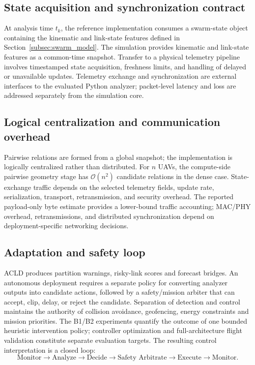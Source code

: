 \documentclass[preprint,12pt]{elsarticle}
\theoremstyle{definition}\newtheorem{definition}{Definition}
\theoremstyle{plain}\newtheorem{theorem}{Theorem}
\theoremstyle{plain}\newtheorem{lemma}{Lemma}
\theoremstyle{plain}\newtheorem{corollary}{Corollary}
\theoremstyle{plain}\newtheorem{assumption}{Assumption}
\theoremstyle{remark}\newtheorem{remark}[theorem]{Remark}
\begin{document}
\subsection{State acquisition and synchronization contract}
\label{subsec:state_contract}
At analysis time $t_k$, the reference implementation consumes a swarm-state object containing the kinematic and link-state features defined in Section~\ref{subsec:swarm_model}. The simulation provides kinematic and link-state features as a common-time snapshot. Transfer to a physical telemetry pipeline involves timestamped state acquisition, freshness limits, and handling of delayed or unavailable updates. Telemetry exchange and synchronization are external interfaces to the evaluated Python analyzer; packet-level latency and loss are addressed separately from the simulation core.

\subsection{Logical centralization and communication overhead}
\label{subsec:centralization_overhead}
Pairwise relations are formed from a global snapshot; the implementation is logically centralized rather than distributed. For $n$ UAVs, the compute-side pairwise geometry stage has $\mathcal O(n^2)$ candidate relations in the dense case. State-exchange traffic depends on the selected telemetry fields, update rate, serialization, transport, retransmission, and security overhead. The reported payload-only byte estimate provides a lower-bound traffic accounting; MAC/PHY overhead, retransmissions, and distributed synchronization depend on deployment-specific networking decisions.

\subsection{Adaptation and safety loop}
\label{subsec:adaptation_loop}
ACLD produces partition warnings, risky-link scores and forecast bridges. An autonomous deployment requires a separate policy for converting analyzer outputs into candidate actions, followed by a safety/mission arbiter that can accept, clip, delay, or reject the candidate. Separation of detection and control maintains the authority of collision avoidance, geofencing, energy constraints and mission priorities. The B1/B2 experiments quantify the outcome of one bounded heuristic intervention policy; controller optimization and full-architecture flight validation constitute separate evaluation targets. The resulting control interpretation is a closed loop:
\[
\text{Monitor}\rightarrow\text{Analyze}\rightarrow\text{Decide}\rightarrow\text{Safety Arbitrate}\rightarrow\text{Execute}\rightarrow\text{Monitor}.
\]
\end{document}
